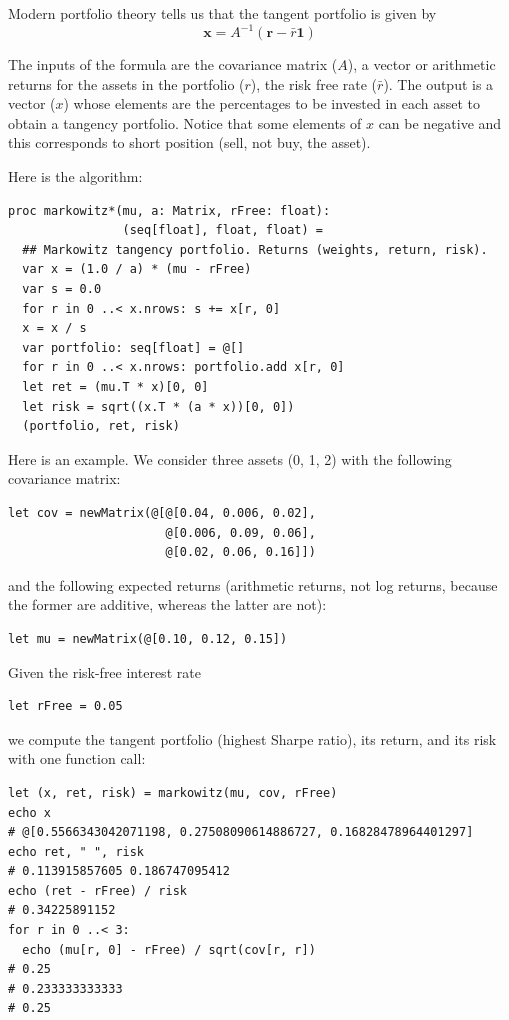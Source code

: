 \documentclass[justified, sixbynine]{tufte-book}
\def\ft{\small\tt}
\theoremstyle{plain}%
\newtheorem * {corollary}{Corollary}
\theoremstyle{definition}
\theoremstyle{remark}
\newtheorem * {remark}{Remark}
\newtheorem * {note}{Note}
\begin{document}
\begin{fullwidth}
Modern portfolio theory tells us that the tangent portfolio is given by
\begin{equation}
\mathbf{x}=A^{-1} ( \mathbf{r}-\bar{r}\mathbf{1})
\end{equation}

The inputs of the formula are the covariance matrix ($A$), a vector or arithmetic returns for the assets in the portfolio ($r$), the risk free rate ($\bar{r}$). The output is a vector ($x$) whose elements are the percentages to be invested in each asset to obtain a tangency portfolio. Notice that some elements of $x$ can be negative and this corresponds to short position (sell, not buy, the asset).

Here is the algorithm:

\begin{lstlisting}[caption={in file: {\ft nlib.nim}}]
proc markowitz*(mu, a: Matrix, rFree: float):
                (seq[float], float, float) =
  ## Markowitz tangency portfolio. Returns (weights, return, risk).
  var x = (1.0 / a) * (mu - rFree)
  var s = 0.0
  for r in 0 ..< x.nrows: s += x[r, 0]
  x = x / s
  var portfolio: seq[float] = @[]
  for r in 0 ..< x.nrows: portfolio.add x[r, 0]
  let ret = (mu.T * x)[0, 0]
  let risk = sqrt((x.T * (a * x))[0, 0])
  (portfolio, ret, risk)
\end{lstlisting}

Here is an example.
We consider three assets (0, 1, 2) with the following covariance matrix:
\begin{lstlisting}
let cov = newMatrix(@[@[0.04, 0.006, 0.02],
                      @[0.006, 0.09, 0.06],
                      @[0.02, 0.06, 0.16]])
\end{lstlisting}
and the following expected returns (arithmetic returns, not log returns, because the former are additive, whereas the latter are not):
\begin{lstlisting}
let mu = newMatrix(@[0.10, 0.12, 0.15])
\end{lstlisting}
Given the risk-free interest rate
\begin{lstlisting}
let rFree = 0.05
\end{lstlisting}
we compute the tangent portfolio (highest Sharpe ratio), its return, and its risk with one function call:
\begin{lstlisting}
let (x, ret, risk) = markowitz(mu, cov, rFree)
echo x
# @[0.5566343042071198, 0.27508090614886727, 0.16828478964401297]
echo ret, " ", risk
# 0.113915857605 0.186747095412
echo (ret - rFree) / risk
# 0.34225891152
for r in 0 ..< 3:
  echo (mu[r, 0] - rFree) / sqrt(cov[r, r])
# 0.25
# 0.233333333333
# 0.25
\end{lstlisting}


\end{fullwidth}
\end{document}

